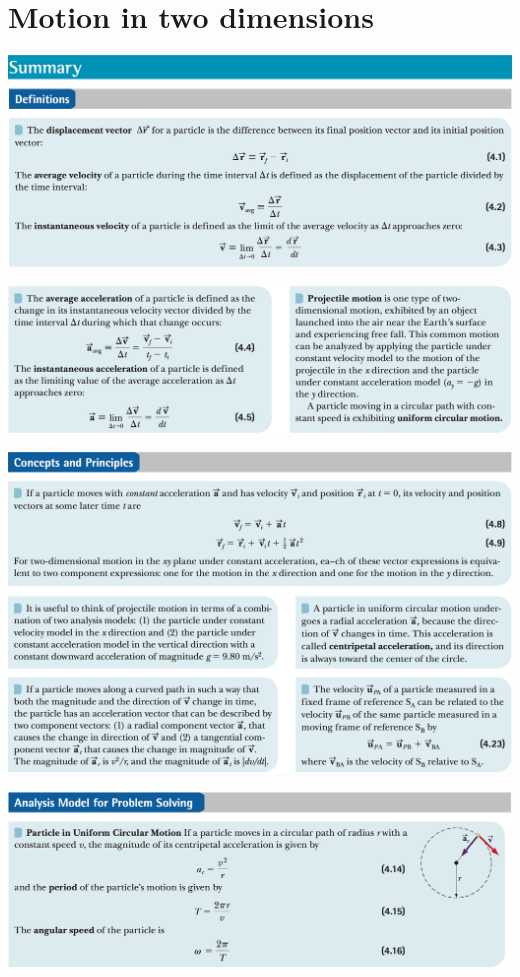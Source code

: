 \documentclass[12pt,a4paper]{article}
\newcommand{\N}{\noindent}
\begin{document}
	\section{Motion in two dimensions}
		\N \includegraphics[scale=.42]{4_a.png}
		
		\vspace{2mm}
		\N \includegraphics[scale=.42]{4_b.png}
		
		\vspace{2mm}
		\N \includegraphics[scale=.42]{4_c.png}
		
		\vspace{2mm}
		\N \includegraphics[scale=.42]{4_d.png}
		
\end{document}
